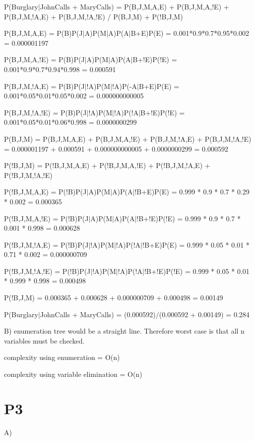 \documentclass{article}
\begin{document}
        P(Burglary$|$JohnCalls + MaryCalls) = P(B,J,M,A,E) + P(B,J,M,A,!E) + P(B,J,M,!A,E) + P(B,J,M,!A,!E) / P(B,J,M) + P(!B,J,M)

	P(B,J,M,A,E) = P(B)P(J$|$A)P(M$|$A)P(A$|$B+E)P(E) = 0.001*0.9*0.7*0.95*0.002 = 0.000001197
	
	P(B,J,M,A,!E) = P(B)P(J$|$A)P(M$|$A)P(A$|$B+!E)P(!E) = 0.001*0.9*0.7*0.94*0.998 = 0.000591
	
	P(B,J,M,!A,E) = P(B)P(J$|$!A)P(M$|$!A)P(-A$|$B+E)P(E) = 0.001*0.05*0.01*0.05*0.002 = 0.000000000005
	
	P(B,J,M,!A,!E) = P(B)P(J$|$!A)P(M$|$!A)P(!A$|$B+!E)P(!E) = 0.001*0.05*0.01*0.06*0.998 = 0.0000000299
	
	P(B,J,M) = P(B,J,M,A,E) + P(B,J,M,A,!E) + P(B,J,M,!A,E) + P(B,J,M,!A,!E) = 0.000001197 + 0.000591 + 0.000000000005 + 0.0000000299 = 0.000592
	
	P(!B,J,M) = P(!B,J,M,A,E) + P(!B,J,M,A,!E) + P(!B,J,M,!A,E) + P(!B,J,M,!A,!E)
	
	P(!B,J,M,A,E) = P(!B)P(J$|$A)P(M$|$A)P(A$|$!B+E)P(E) = 0.999 * 0.9 * 0.7 * 0.29 * 0.002 = 0.000365
	
	P(!B,J,M,A,!E) = P(!B)P(J$|$A)P(M$|$A)P(A$|$!B+!E)P(!E) = 0.999 * 0.9 * 0.7 * 0.001 * 0.998 = 0.000628
	
	P(!B,J,M,!A,E) = P(!B)P(J$|$!A)P(M$|$!A)P(!A$|$!B+E)P(E) = 0.999 * 0.05 * 0.01 * 0.71 * 0.002 = 0.000000709
	
	P(!B,J,M,!A,!E) = P(!B)P(J$|$!A)P(M$|$!A)P(!A$|$!B+!E)P(!E) = 0.999 * 0.05 * 0.01 * 0.999 * 0.998 = 0.000498
	
	P(!B,J,M) = 0.000365 + 0.000628 + 0.000000709 + 0.000498 = 0.00149
	
	P(Burglary$|$JohnCalls + MaryCalls) = (0.000592)/(0.000592 + 0.00149) = 0.284
	
\hspace{5mm}
	
B)	
        enumeration tree would be a straight line. Therefore worst case is that all n variables must be checked. 

	complexity using enumeration = O(n)
	
	complexity using variable elimination = O(n)
	
\section*{P3}

\hspace{5mm}

A)
\end{document}
